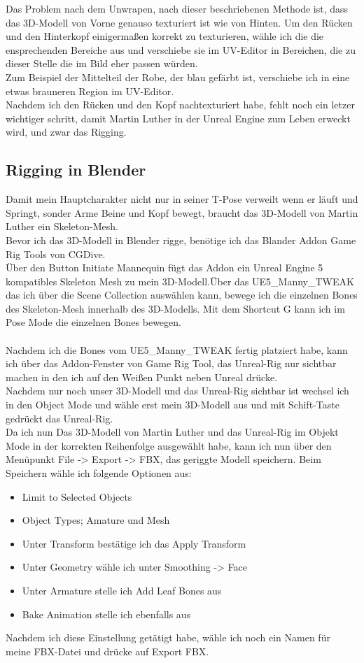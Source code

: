 {Das Problem nach dem Unwrapen, nach dieser beschriebenen Methode ist, dass das 3D-Modell von Vorne genauso texturiert ist wie von Hinten. Um den Rücken und den Hinterkopf einigermaßen korrekt zu texturieren, wähle ich die die ensprechenden Bereiche aus und verschiebe sie im UV-Editor in Bereichen, die zu dieser Stelle die im Bild eher passen würden.
\\
Zum Beispiel der Mittelteil der Robe, der blau gefärbt ist, verschiebe ich in eine etwas brauneren Region im UV-Editor.
\\
Nachdem ich den Rücken und den Kopf nachtexturiert habe, fehlt noch ein letzer wichtiger schritt, damit Martin Luther in der Unreal Engine zum Leben erweckt wird, und zwar das Rigging.


\subsection{Rigging in Blender}%
Damit mein Hauptcharakter nicht nur in seiner T-Pose verweilt wenn er läuft und Springt, sonder Arme Beine und Kopf bewegt, braucht das 3D-Modell von Martin Luther ein Skeleton-Mesh.
\\
Bevor ich das 3D-Modell in Blender rigge, benötige ich das Blander Addon Game Rig Tools von CGDive.
\\
Über den Button Initiate Mannequin fügt das Addon ein Unreal Engine 5 kompatibles Skeleton Mesh zu mein 3D-Modell.Über das UE5\_Manny\_TWEAK das ich über die Scene Collection auswählen kann, bewege ich die einzelnen Bones des Skeleton-Mesh innerhalb des 3D-Modells. Mit dem Shortcut G kann ich im Pose Mode die einzelnen Bones bewegen.
\\
\\
Nachdem ich die Bones vom UE5\_Manny\_TWEAK fertig platziert habe, kann ich über das Addon-Fenster von Game Rig Tool, das Unreal-Rig nur sichtbar machen in den ich auf den Weißen Punkt neben Unreal drücke. 
\\
Nachdem nur noch unser 3D-Modell und das Unreal-Rig sichtbar ist wechsel ich in den Object Mode und wähle erst mein 3D-Modell aus und mit Schift-Taste gedrückt das Unreal-Rig.
\\
Da ich nun Das 3D-Modell von Martin Luther und das Unreal-Rig im Objekt Mode in der korrekten Reihenfolge ausgewählt habe, kann ich nun über den Menüpunkt File -> Export -> FBX, das geriggte Modell speichern. Beim Speichern wähle ich folgende Optionen aus:
\begin{itemize}
	\item Limit to Selected Objects 
	\item Object Types; Amature und Mesh
	\item Unter Transform bestätige ich das Apply Transform
	\item Unter Geometry wähle ich unter Smoothing -> Face
	\item Unter Armature stelle ich Add Leaf Bones aus
	\item Bake Animation stelle ich ebenfalls aus
\end{itemize}
Nachdem ich diese Einstellung getätigt habe, wähle ich noch ein Namen für meine FBX-Datei und drücke auf Export FBX.

}
